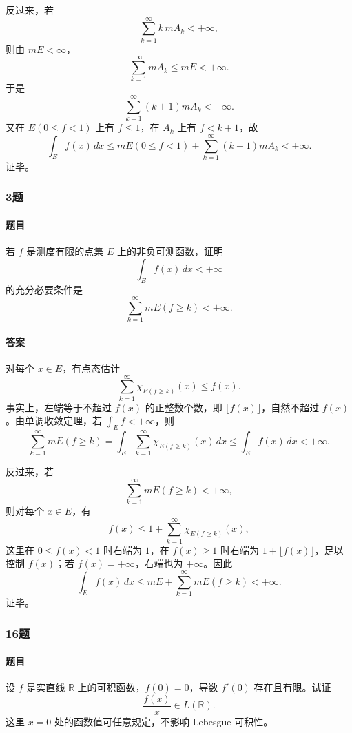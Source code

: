 \documentclass{article}
\begin{document}
	反过来，若
	\[
	\sum_{k=1}^{\infty} k\,mA_k<+\infty,
	\]
	则由 $mE<\infty$，
	\[
	\sum_{k=1}^{\infty}mA_k\le mE<+\infty.
	\]
	于是
	\[
	\sum_{k=1}^{\infty}(k+1)mA_k<+\infty.
	\]
	又在 $E(0\le f<1)$ 上有 $f\le1$，在 $A_k$ 上有 $f<k+1$，故
	\[
	\int_E f(x)\,dx
	\le mE(0\le f<1)+\sum_{k=1}^{\infty}(k+1)mA_k<+\infty.
	\]
	证毕。
	
	\subsubsection*{3题}
	\paragraph{题目} 若 $f$ 是测度有限的点集 $E$ 上的非负可测函数，证明
	\[
	\int_E f(x)\,dx<+\infty
	\]
	的充分必要条件是
	\[
	\sum_{k=1}^{\infty}mE(f\ge k)<+\infty.
	\]
	
	\paragraph{答案} 对每个 $x\in E$，有点态估计
	\[
	\sum_{k=1}^{\infty}\chi_{E(f\ge k)}(x)\le f(x).
	\]
	事实上，左端等于不超过 $f(x)$ 的正整数个数，即 $\lfloor f(x)\rfloor$，自然不超过 $f(x)$。由单调收敛定理，若 $\int_E f<+\infty$，则
	\[
	\sum_{k=1}^{\infty}mE(f\ge k)
	=\int_E\sum_{k=1}^{\infty}\chi_{E(f\ge k)}(x)\,dx
	\le \int_E f(x)\,dx<+\infty.
	\]
	
	反过来，若
	\[
	\sum_{k=1}^{\infty}mE(f\ge k)<+\infty,
	\]
	则对每个 $x\in E$，有
	\[
	f(x)\le 1+\sum_{k=1}^{\infty}\chi_{E(f\ge k)}(x),
	\]
	这里在 $0\le f(x)<1$ 时右端为 $1$，在 $f(x)\ge1$ 时右端为 $1+\lfloor f(x)\rfloor$，足以控制 $f(x)$；若 $f(x)=+\infty$，右端也为 $+\infty$。因此
	\[
	\int_E f(x)\,dx
	\le mE+\sum_{k=1}^{\infty}mE(f\ge k)<+\infty.
	\]
	证毕。
	
	
	\subsubsection*{16题}
	\paragraph{题目} 设 $f$ 是实直线 $\mathbb{R}$ 上的可积函数，$f(0)=0$，导数 $f'(0)$ 存在且有限。试证
	\[
	\frac{f(x)}{x}\in L(\mathbb{R}).
	\]
	这里 $x=0$ 处的函数值可任意规定，不影响 Lebesgue 可积性。
	
\end{document}

